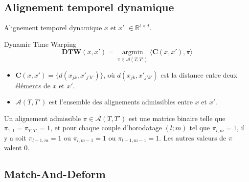 \documentclass{beamer}
\begin{document}
\subsection{Alignement temporel dynamique}

\begin{frame}{Alignement temporel dynamique}
    $x$ et $x'$ $\in \mathbb{R}^{t\times d}$.
    \begin{block}{Dynamic Time Warping}
        $$\textbf{DTW}(x,x') = \underset{\pi \in \mathcal{A}(T, T')}{\operatorname{\arg \min}} \langle \textbf{C}(x, x'), \pi \rangle$$
    \end{block}
    \begin{itemize}
        \item $\textbf{C}(x, x') = \{d(x_{jk}, x'_{j'k'})\}$, où $d(x_{jk}, x'_{j'k'})$ est la distance entre deux éléments de $x$ et $x'$.
        \item $\mathcal{A}(T, T')$ est l'ensemble des alignements admissibles entre $x$ et $x'$. 
    \end{itemize}
    Un alignement admissible $\pi \in \mathcal{A}(T, T')$ est une matrice binaire telle que $\pi_{1,1} = \pi_{T, T'} = 1$,
    et pour chaque couple d'horodatage $(l;m)$ tel que $\pi_{l, m} = 1$, il y a soit
    $\pi_{l-1, m} = 1$ ou $\pi_{l, m-1} = 1$ ou $\pi_{l-1, m-1} = 1$.
    Les autres valeurs de $\pi$ valent 0.
\end{frame}


\subsection{Match-And-Deform}
\end{document}
